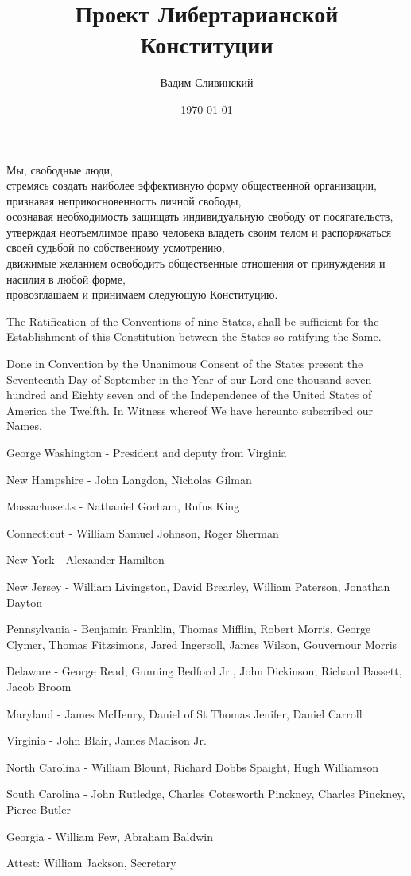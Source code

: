 \documentclass[12pt]{constitution}
\begin{document}
\title{Проект Либертарианской Конституции}
\author{Вадим Сливинский}
\date{\today}
\maketitle
\setcounter{tocdepth}{0}
\tableofcontents
\newpage

Мы, свободные люди,\\
стремясь создать наиболее эффективную форму общественной организации,\\
признавая неприкосновенность личной свободы,\\
осознавая необходимость защищать индивидуальную свободу от посягательств,\\
утверждая неотъемлимое право человека владеть своим телом и распоряжаться своей судьбой по собственному усмотрению, \\
движимые желанием освободить общественные отношения от принуждения и насилия в любой форме,\\
провозглашаем и принимаем следующую Конституцию.



The Ratification of the Conventions of nine States, shall be sufficient for the
Establishment of this Constitution between the States so ratifying the Same.

Done in Convention by the Unanimous Consent of the States present the
Seventeenth Day of September in the Year of our Lord one thousand seven hundred
and Eighty seven and of the Independence of the United States of America the
Twelfth. In Witness whereof We have hereunto subscribed our Names.

George Washington - President and deputy from Virginia

New Hampshire - John Langdon, Nicholas Gilman

Massachusetts - Nathaniel Gorham, Rufus King

Connecticut - William Samuel Johnson, Roger Sherman

New York - Alexander Hamilton

New Jersey - William Livingston, David Brearley, William Paterson, Jonathan
Dayton

Pennsylvania - Benjamin Franklin, Thomas Mifflin, Robert Morris, George Clymer,
Thomas Fitzsimons, Jared Ingersoll, James Wilson, Gouvernour Morris

Delaware - George Read, Gunning Bedford Jr., John Dickinson, Richard Bassett,
Jacob Broom

Maryland - James McHenry, Daniel of St Thomas Jenifer, Daniel Carroll

Virginia - John Blair, James Madison Jr.

North Carolina - William Blount, Richard Dobbs Spaight, Hugh Williamson

South Carolina - John Rutledge, Charles Cotesworth Pinckney, Charles Pinckney,
Pierce Butler

Georgia - William Few, Abraham Baldwin

Attest: William Jackson, Secretary
\end{document}
